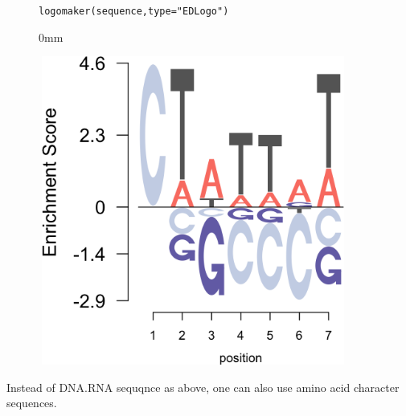 \documentclass[12pt]{article}\usepackage[]{graphicx}\usepackage[usenames,dvipsnames]{color}
\newcommand{\hlstr}[1]{\textcolor[rgb]{0.251,0.627,0.251}{#1}}%
\newcommand{\hlstd}[1]{\textcolor[rgb]{0.251,0.251,0.251}{#1}}%
\newcommand{\hlkwc}[1]{\textcolor[rgb]{0.251,0.251,0.251}{#1}}%
\newcommand{\hlkwd}[1]{\textcolor[rgb]{0.878,0.439,0.125}{#1}}%
\newenvironment{knitrout}{}{} %
\begin{document}
\begin{figure}[h]
\begin{center}
\begin{knitrout}
\color{fgcolor}\begin{kframe}
\begin{alltt}
\hlkwd{logomaker}\hlstd{(sequence,} \hlkwc{type} \hlstd{=} \hlstr{"EDLogo"}\hlstd{)}
\end{alltt}
\end{kframe}\begin{adjustwidth}{\fltoffset}{0mm}

\includegraphics[width=4in,height=4in]{figure/ED_logo-1} \hfill{}

\end{adjustwidth}
\end{knitrout}
\end{center}
\end{figure}

\newpage

Instead of DNA.RNA sequqnce as above, one can also use amino acid character sequences.
\end{document}
